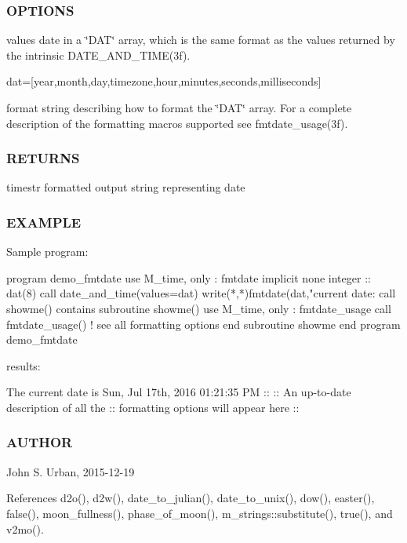 \subsubsection*{O\+P\+T\+I\+O\+NS}

values date in a \char`\"{}\+D\+A\+T\char`\"{} array, which is the same format as the values returned by the intrinsic D\+A\+T\+E\+\_\+\+A\+N\+D\+\_\+\+T\+I\+M\+E(3f).

dat=\mbox{[}year,month,day,timezone,hour,minutes,seconds,milliseconds\mbox{]}

format string describing how to format the \char`\"{}\+D\+A\+T\char`\"{} array. For a complete description of the formatting macros supported see fmtdate\+\_\+usage(3f). \subsubsection*{R\+E\+T\+U\+R\+NS}

timestr formatted output string representing date

\subsubsection*{E\+X\+A\+M\+P\+LE}

\begin{DoxyVerb}Sample program:

 program demo_fmtdate
 use M_time, only : fmtdate
 implicit none
 integer :: dat(8)
    call date_and_time(values=dat)
    write(*,*)fmtdate(dat,"current date: %
    call showme()
 contains
 subroutine showme()
    use M_time, only : fmtdate_usage
    call fmtdate_usage() ! see all formatting options
 end subroutine showme
 end program demo_fmtdate

results:

   The current date is Sun, Jul 17th, 2016 01:21:35 PM
    ::
    :: An up-to-date description of all the
    :: formatting options will appear here
    ::
\end{DoxyVerb}


\subsubsection*{A\+U\+T\+H\+OR}

John S. Urban, 2015-\/12-\/19 

References d2o(), d2w(), date\+\_\+to\+\_\+julian(), date\+\_\+to\+\_\+unix(), dow(), easter(), false(), moon\+\_\+fullness(), phase\+\_\+of\+\_\+moon(), m\+\_\+strings\+::substitute(), true(), and v2mo().


